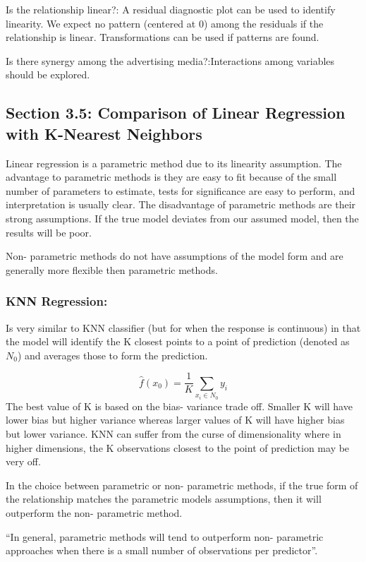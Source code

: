 \documentclass[
]{article}
\begin{document}
Is the relationship linear?: A residual diagnostic plot can be used to
identify linearity. We expect no pattern (centered at 0) among the
residuals if the relationship is linear. Transformations can be used if
patterns are found.

Is there synergy among the advertising media?:Interactions among
variables should be explored.

\hypertarget{section-3.5-comparison-of-linear-regression-with-k-nearest-neighbors}{%
\subsection{Section 3.5: Comparison of Linear Regression with K-Nearest
Neighbors}\label{section-3.5-comparison-of-linear-regression-with-k-nearest-neighbors}}

Linear regression is a parametric method due to its linearity
assumption. The advantage to parametric methods is they are easy to fit
because of the small number of parameters to estimate, tests for
significance are easy to perform, and interpretation is usually clear.
The disadvantage of parametric methods are their strong assumptions. If
the true model deviates from our assumed model, then the results will be
poor.

Non- parametric methods do not have assumptions of the model form and
are generally more flexible then parametric methods.

\hypertarget{knn-regression}{%
\subsubsection{KNN Regression:}\label{knn-regression}}

Is very similar to KNN classifier (but for when the response is
continuous) in that the model will identify the K closest points to a
point of prediction (denoted as \(N_0\)) and averages those to form the
prediction.

\[\hat{f}(x_0) = \frac{1}{K}\sum_{x_i \in N_0} y_i\] The best value of K
is based on the bias- variance trade off. Smaller K will have lower bias
but higher variance whereas larger values of K will have higher bias but
lower variance. KNN can suffer from the curse of dimensionality where in
higher dimensions, the K observations closest to the point of prediction
may be very off.

In the choice between parametric or non- parametric methods, if the true
form of the relationship matches the parametric models assumptions, then
it will outperform the non- parametric method.

``In general, parametric methods will tend to outperform non- parametric
approaches when there is a small number of observations per predictor''.
\end{document}
